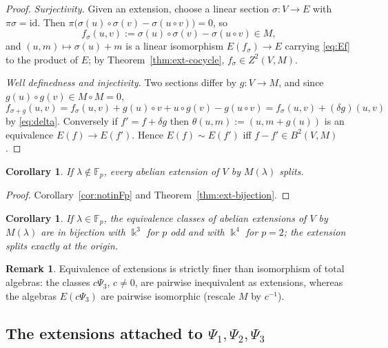 \documentclass[11pt,reqno]{amsart}
\theoremstyle{plain}
\newtheorem{corollary}[theorem]{Corollary}
\theoremstyle{definition}
\newtheorem{remark}[theorem]{Remark}
\newcommand{\kk}{\Bbbk}
\newcommand{\Zt}{Z^2}
\newcommand{\Bt}{B^2}
\newcommand{\Fp}{\mathbb{F}_p}
\begin{document}
\begin{proof}
\emph{Surjectivity.} Given an extension, choose a linear section $\sigma:V\to E$ with
$\pi\sigma=\mathrm{id}$. Then
$\pi\bigl(\sigma(u)\circ\sigma(v)-\sigma(u\circ v)\bigr)=0$, so
\begin{equation}
f_\sigma(u,v):=\sigma(u)\circ\sigma(v)-\sigma(u\circ v)\in M ,
\label{eq:fsigma}
\end{equation}
and $(u,m)\mapsto\sigma(u)+m$ is a linear isomorphism $E(f_\sigma)\to E$ carrying
\eqref{eq:Ef} to the product of $E$; by Theorem~\ref{thm:ext-cocycle},
$f_\sigma\in\Zt(V,M)$.

\emph{Well definedness and injectivity.} Two sections differ by $g:V\to M$, and since
$g(u)\circ g(v)\in M\circ M=0$,
\[
f_{\sigma+g}(u,v)=f_\sigma(u,v)+g(u)\circ v+u\circ g(v)-g(u\circ v)=f_\sigma(u,v)+(\delta g)(u,v)
\]
by \eqref{eq:delta}. Conversely if $f'=f+\delta g$ then $\theta(u,m):=(u,m+g(u))$ is an
equivalence $E(f)\to E(f')$. Hence $E(f)\sim E(f')$ iff $f-f'\in\Bt(V,M)$.
\end{proof}

\begin{corollary}\label{cor:ext-split}
If $\lambda\notin\Fp$, every abelian extension of $V$ by $M(\lambda)$ splits.
\end{corollary}

\begin{proof}
Corollary~\ref{cor:notinFp} and Theorem~\ref{thm:ext-bijection}.
\end{proof}

\begin{corollary}\label{cor:ext-count}
If $\lambda\in\Fp$, the equivalence classes of abelian extensions of $V$ by $M(\lambda)$ are
in bijection with $\kk^3$ for $p$ odd and with $\kk^4$ for $p=2$; the extension splits
exactly at the origin.
\end{corollary}

\begin{remark}
Equivalence of extensions is strictly finer than isomorphism of total algebras: the classes
$c\Psi_3$, $c\ne0$, are pairwise inequivalent as extensions, whereas the algebras
$E(c\Psi_3)$ are pairwise isomorphic (rescale $M$ by $c^{-1}$).
\end{remark}

\subsection{The extensions attached to $\Psi_1,\Psi_2,\Psi_3$}
\end{document}
